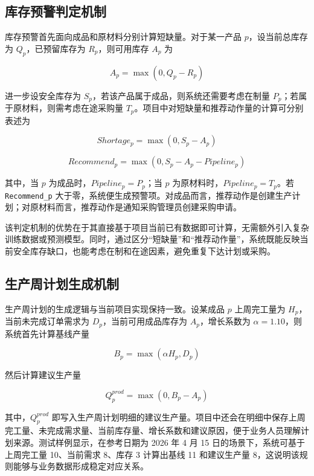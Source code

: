 \subsection{库存预警判定机制}

库存预警首先面向成品和原材料分别计算短缺量。对于某一产品 $p$，设当前总库存为 $Q_p$，已预留库存为 $R_p$，则可用库存 $A_p$ 为

\begin{equation}
A_p = \max(0, Q_p - R_p)
\end{equation}

进一步设安全库存为 $S_p$，若该产品属于成品，则系统还需要考虑在制量 $P_p$；若属于原材料，则需考虑在途采购量 $T_p$。项目中对短缺量和推荐动作量的计算可分别表述为

\begin{equation}
Shortage_p = \max(0, S_p - A_p)
\end{equation}

\begin{equation}
Recommend_p = \max(0, S_p - A_p - Pipeline_p)
\end{equation}

其中，当 $p$ 为成品时，$Pipeline_p = P_p$；当 $p$ 为原材料时，$Pipeline_p = T_p$。若 \texttt{Recommend\_p} 大于零，系统便生成预警项。对成品而言，推荐动作是创建生产计划；对原材料而言，推荐动作是通知采购管理员创建采购申请。

该判定机制的优势在于其直接基于项目当前已有数据即可计算，无需额外引入复杂训练数据或预测模型。同时，通过区分“短缺量”和“推荐动作量”，系统既能反映当前安全库存缺口，也能考虑在制和在途因素，避免重复下达计划或采购。

\subsection{生产周计划生成机制}

生产周计划的生成逻辑与当前项目实现保持一致。设某成品 $p$ 上周完工量为 $H_p$，当前未完成订单需求为 $D_p$，当前可用成品库存为 $A_p$，增长系数为 $\alpha = 1.10$，则系统首先计算基线产量

\begin{equation}
B_p = \max(\alpha H_p, D_p)
\end{equation}

然后计算建议生产量

\begin{equation}
Q_p^{prod} = \max(0, B_p - A_p)
\end{equation}

其中，$Q_p^{prod}$ 即写入生产周计划明细的建议生产量。项目中还会在明细中保存上周完工量、未完成需求量、当前库存量、增长系数和建议原因，便于业务人员理解计划来源。测试样例显示，在参考日期为 2026 年 4 月 15 日的场景下，系统可基于上周完工量 10、当前需求 8、库存 3 计算出基线 11 和建议生产量 8，这说明该规则能够与业务数据形成稳定对应关系。

